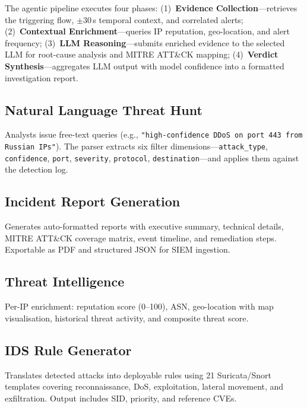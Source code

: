 \documentclass[11pt,a4paper]{article}
\begin{document}
The agentic pipeline executes four phases: (1)~\textbf{Evidence Collection}---retrieves the triggering flow, $\pm$30\,s temporal context, and correlated alerts; (2)~\textbf{Contextual Enrichment}---queries IP reputation, geo-location, and alert frequency; (3)~\textbf{LLM Reasoning}---submits enriched evidence to the selected LLM for root-cause analysis and MITRE ATT\&CK mapping; (4)~\textbf{Verdict Synthesis}---aggregates LLM output with model confidence into a formatted investigation report.

\subsection{Natural Language Threat Hunt}
\label{sec:nl_threat_hunt}

Analysts issue free-text queries (e.g., \texttt{"high-confidence DDoS on port 443 from Russian IPs"}).  The parser extracts six filter dimensions---\texttt{attack\_type}, \texttt{confidence}, \texttt{port}, \texttt{severity}, \texttt{protocol}, \texttt{destination}---and applies them against the detection log.

\subsection{Incident Report Generation}
\label{sec:incident_report}

Generates auto-formatted reports with executive summary, technical details, MITRE ATT\&CK coverage matrix, event timeline, and remediation steps.  Exportable as PDF and structured JSON for SIEM ingestion.

\subsection{Threat Intelligence}
\label{sec:threat_intel}

Per-IP enrichment: reputation score (0--100), ASN, geo-location with map visualisation, historical threat activity, and composite threat score.

\subsection{IDS Rule Generator}
\label{sec:rule_generator}

Translates detected attacks into deployable rules using 21 Suricata/Snort templates covering reconnaissance, DoS, exploitation, lateral movement, and exfiltration.  Output includes SID, priority, and reference CVEs.
\end{document}
